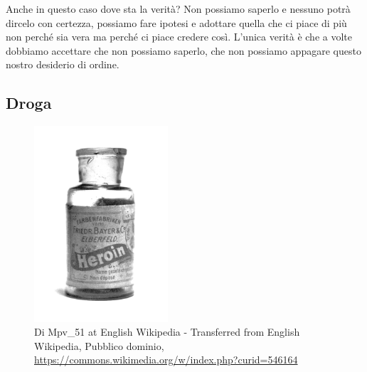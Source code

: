 \documentclass[12pt]{book} %
\begin{document}
Anche in questo caso dove sta la verità? Non possiamo saperlo e nessuno potrà dircelo con certezza, possiamo fare
ipotesi e adottare quella che ci piace di più non perché sia vera ma perché ci piace credere così.
L'unica verità è che a volte dobbiamo accettare che non possiamo saperlo, che non possiamo
appagare questo nostro desiderio di ordine.


\bigskip

\subsection{Droga}

\begin{figure}
\includegraphics[width=4.972cm,height=7.287cm]{images/Libro-img054.jpg}
\caption*{Di Mpv\_51 at English Wikipedia - Transferred from English Wikipedia, Pubblico dominio, \protect\url{https://commons.wikimedia.org/w/index.php?curid=546164} }
\end{figure}
\end{document}
